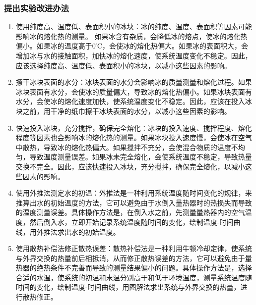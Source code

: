 \documentclass[dvipsnames, svgnames,a4paper,11pt]{article}
\begin{document}
	\subsubsection{提出实验改进办法}
	\begin{enumerate}
		\item  使用纯度高、温度低、表面积小的冰块：冰的纯度、温度、表面积等因素可能影响冰的熔化热的测量。
		如果冰含有杂质，会降低冰的熔点，使冰的熔化热偏小。如果冰的温度高于0℃，会使冰的熔化热偏大。如果冰的表面积大，会增加冰与水的接触面积，加快冰的熔化速度，使系统温度变化不稳定。因此，应该选择纯度高、温度低、表面积小的冰块，以减小这些因素的影响。
		\item 擦干冰块表面的水分：冰块表面的水分会影响冰的质量测量和熔化过程。如果冰块表面有水分，会使冰的质量偏大，导致冰的熔化热偏小。如果冰块表面有水分，会使冰的熔化速度加快，使系统温度变化不稳定。因此，应该在投入冰块之前，用干净的纸巾擦干冰块表面的水分，以减小这些因素的影响。
		\item 快速投入冰块，充分搅拌，确保完全熔化：冰块的投入速度、搅拌程度、熔化程度等因素也会影响冰的熔化热的测量。如果冰块投入速度慢，会使冰在空气中散热，导致冰的熔化热偏大。如果搅拌不充分，会使混合物质的温度不均匀，导致温度测量误差。如果冰未完全熔化，会使系统温度不稳定，导致热量交换不完全。因此，应该快速投入冰块，充分搅拌，确保完全熔化，以减小这些因素的影响。
		\item 使用外推法测定水的初温：外推法是一种利用系统温度随时间变化的规律，来推算出水的初始温度的方法，它可以避免由于水倒入量热器时的热损失而导致的温度测量误差。具体操作方法是，在倒入水之前，先测量量热器内的空气温度，然后倒入水，立即开始记录系统温度随时间的变化，绘制温度-时间曲线，用外推法求出水的初始温度。
		\item 使用散热补偿法修正散热误差：散热补偿法是一种利用牛顿冷却定律，使系统与外界交换的热量前后相抵消，从而修正散热误差的方法，它可以避免由于量热器的绝热条件不完善而导致的测量结果偏小的问题。具体操作方法是，选择合适的水温，使系统的初温和末温分别高于和低于环境温度，测量系统温度随时间的变化，绘制温度-时间曲线，用图解法求出系统与外界交换的热量，进行散热修正。
	\end{enumerate}	
	
	\clearpage
\end{document}
